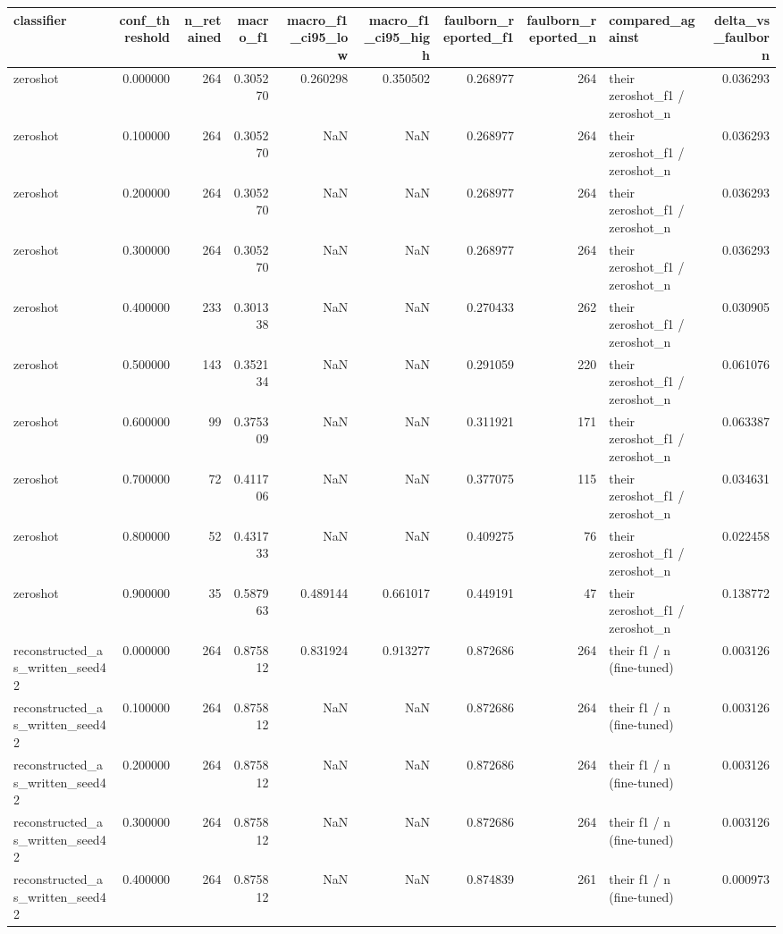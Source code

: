 \begin{tabular}{lrrrrrrrlr}
\toprule
classifier & conf_threshold & n_retained & macro_f1 & macro_f1_ci95_low & macro_f1_ci95_high & faulborn_reported_f1 & faulborn_reported_n & compared_against & delta_vs_faulborn \\
\midrule
zeroshot & 0.000000 & 264 & 0.305270 & 0.260298 & 0.350502 & 0.268977 & 264 & their zeroshot_f1 / zeroshot_n & 0.036293 \\
zeroshot & 0.100000 & 264 & 0.305270 & NaN & NaN & 0.268977 & 264 & their zeroshot_f1 / zeroshot_n & 0.036293 \\
zeroshot & 0.200000 & 264 & 0.305270 & NaN & NaN & 0.268977 & 264 & their zeroshot_f1 / zeroshot_n & 0.036293 \\
zeroshot & 0.300000 & 264 & 0.305270 & NaN & NaN & 0.268977 & 264 & their zeroshot_f1 / zeroshot_n & 0.036293 \\
zeroshot & 0.400000 & 233 & 0.301338 & NaN & NaN & 0.270433 & 262 & their zeroshot_f1 / zeroshot_n & 0.030905 \\
zeroshot & 0.500000 & 143 & 0.352134 & NaN & NaN & 0.291059 & 220 & their zeroshot_f1 / zeroshot_n & 0.061076 \\
zeroshot & 0.600000 & 99 & 0.375309 & NaN & NaN & 0.311921 & 171 & their zeroshot_f1 / zeroshot_n & 0.063387 \\
zeroshot & 0.700000 & 72 & 0.411706 & NaN & NaN & 0.377075 & 115 & their zeroshot_f1 / zeroshot_n & 0.034631 \\
zeroshot & 0.800000 & 52 & 0.431733 & NaN & NaN & 0.409275 & 76 & their zeroshot_f1 / zeroshot_n & 0.022458 \\
zeroshot & 0.900000 & 35 & 0.587963 & 0.489144 & 0.661017 & 0.449191 & 47 & their zeroshot_f1 / zeroshot_n & 0.138772 \\
reconstructed_as_written_seed42 & 0.000000 & 264 & 0.875812 & 0.831924 & 0.913277 & 0.872686 & 264 & their f1 / n (fine-tuned) & 0.003126 \\
reconstructed_as_written_seed42 & 0.100000 & 264 & 0.875812 & NaN & NaN & 0.872686 & 264 & their f1 / n (fine-tuned) & 0.003126 \\
reconstructed_as_written_seed42 & 0.200000 & 264 & 0.875812 & NaN & NaN & 0.872686 & 264 & their f1 / n (fine-tuned) & 0.003126 \\
reconstructed_as_written_seed42 & 0.300000 & 264 & 0.875812 & NaN & NaN & 0.872686 & 264 & their f1 / n (fine-tuned) & 0.003126 \\
reconstructed_as_written_seed42 & 0.400000 & 264 & 0.875812 & NaN & NaN & 0.874839 & 261 & their f1 / n (fine-tuned) & 0.000973 \\

\end{tabular}
